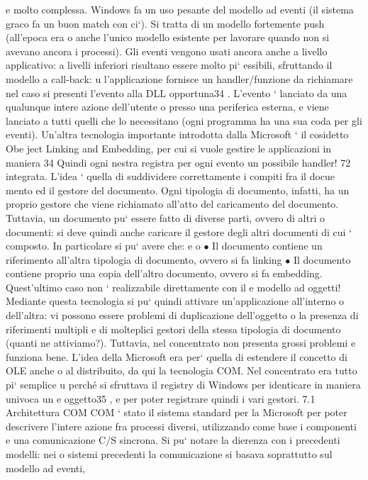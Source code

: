 \documentclass[a4paper,12pt]{article}
\begin{document}
e
molto complessa.
Windows fa un uso pesante del modello ad eventi (il sistema graco fa un
buon match con ci`). Si tratta di un modello fortemente push (all'epoca era
o
anche l'unico modello esistente per lavorare quando non si avevano ancora i
processi). Gli eventi vengono usati ancora anche a livello applicativo: a livelli
inferiori risultano essere molto pi` essibili, sfruttando il modello a call-back:
u
l'applicazione fornisce un handler/funzione da richiamare nel caso si presenti
l'evento alla DLL opportuna34 . L'evento ` lanciato da una qualunque intere
azione dell'utente o presso una periferica esterna, e viene lanciato a tutti quelli
che lo necessitano (ogni programma ha una sua coda per gli eventi).
Un'altra tecnologia importante introdotta dalla Microsoft ` il cosidetto Obe
ject Linking and Embedding, per cui si vuole gestire le applicazioni in maniera
34 Quindi
ogni nestra registra per ogni evento un possibile handler!
72
integrata. L'idea ` quella di suddividere correttamente i compiti fra il docue
mento ed il gestore del documento. Ogni tipologia di documento, infatti, ha un
proprio gestore che viene richiamato all'atto del caricamento del documento.
Tuttavia, un documento pu` essere fatto di diverse parti, ovvero di altri
o
documenti: si deve quindi anche caricare il gestore degli altri documenti di cui
` composto. In particolare si pu` avere che:
e
o
$\bullet$ Il documento contiene un riferimento all'altra tipologia di documento,
ovvero si fa linking
$\bullet$ Il documento contiene proprio una copia dell'altro documento, ovvero si
fa embedding. Quest'ultimo caso non ` realizzabile direttamente con il
e
modello ad oggetti!
Mediante questa tecnologia si pu` quindi attivare un'applicazione all'interno
o
dell'altra: vi possono essere problemi di duplicazione dell'oggetto o la presenza
di riferimenti multipli e di molteplici gestori della stessa tipologia di documento
(quanti ne attiviamo?). Tuttavia, nel concentrato non presenta grossi problemi
e funziona bene.
L'idea della Microsoft era per` quella di estendere il concetto di OLE anche
o
al distribuito, da qui la tecnologia COM. Nel concentrato era tutto pi` semplice
u
perché si sfruttava il registry di Windows per identicare in maniera univoca un
e
oggetto35 , e per poter registrare quindi i vari gestori.
7.1
Architettura COM
COM ` stato il sistema standard per la Microsoft per poter descrivere l'intere
azione fra processi diversi, utilizzando come base i componenti e una comunicazione C/S sincrona. Si pu` notare la
dierenza con i precedenti modelli: nei
o
sistemi precedenti la comunicazione si basava soprattutto sul modello ad eventi,
\end{document}
